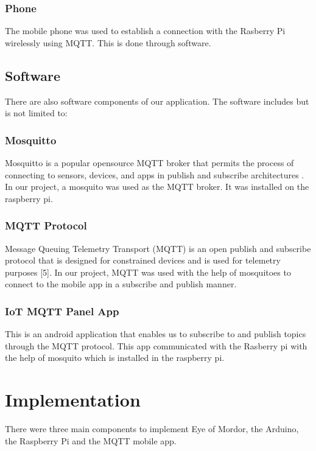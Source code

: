 \documentclass[12pt]{article}
\begin{document}
\subsubsection{Phone}

The mobile phone was used to establish a connection with the Rasberry Pi wirelessly using MQTT. This is done through software.

\subsection{Software} 

There are also software components of our application. The software includes but is not limited to:

\subsubsection{Mosquitto} 

Mosquitto is a popular opensource MQTT broker that permits the process of connecting to sensors, devices, and apps in publish and subscribe architectures \cite{tech4}. In our project, a mosquito was used as the MQTT broker. It was installed on the raspberry pi.

\subsubsection{MQTT Protocol}


Message Queuing Telemetry Transport (MQTT) is an open publish and subscribe protocol that is designed for constrained devices and is used for telemetry purposes [5]. In our project, MQTT was used with the help of mosquitoes to connect to the mobile app in a subscribe and publish manner.

\subsubsection{IoT MQTT Panel App}


This is an android application that enables us to subscribe to and publish topics through the MQTT protocol. This app communicated with the Rasberry pi with the help of mosquito which is installed in the raspberry pi. 

\section{Implementation} \label{sec:implementation}

There were three main components to implement Eye of Mordor, the Arduino, the Raspberry Pi and the MQTT mobile app.
\end{document}
